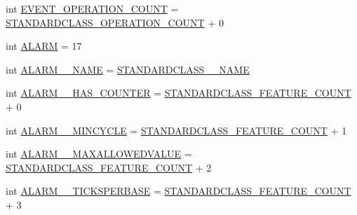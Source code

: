 \begin{DoxyCompactItemize}
\item 
int \hyperlink{interfaceshootingmachineemfmodel_1_1_shootingmachineemfmodel_package_a24a1efdc251910cf4131efe9e2fee313}{E\-V\-E\-N\-T\-\_\-\-O\-P\-E\-R\-A\-T\-I\-O\-N\-\_\-\-C\-O\-U\-N\-T} = \hyperlink{interfaceshootingmachineemfmodel_1_1_shootingmachineemfmodel_package_a2fe5d848cfe0a02fe5609e2c5ed7e7c7}{S\-T\-A\-N\-D\-A\-R\-D\-C\-L\-A\-S\-S\-\_\-\-O\-P\-E\-R\-A\-T\-I\-O\-N\-\_\-\-C\-O\-U\-N\-T} + 0
\item 
int \hyperlink{interfaceshootingmachineemfmodel_1_1_shootingmachineemfmodel_package_adae05455839bcd40f9790082ac94aabc}{A\-L\-A\-R\-M} = 17
\item 
int \hyperlink{interfaceshootingmachineemfmodel_1_1_shootingmachineemfmodel_package_a14df867c3b2b595f2fa93d35083e8097}{A\-L\-A\-R\-M\-\_\-\-\_\-\-N\-A\-M\-E} = \hyperlink{interfaceshootingmachineemfmodel_1_1_shootingmachineemfmodel_package_a06475d7d54d52ee19b2aaf4d5d73c738}{S\-T\-A\-N\-D\-A\-R\-D\-C\-L\-A\-S\-S\-\_\-\-\_\-\-N\-A\-M\-E}
\item 
int \hyperlink{interfaceshootingmachineemfmodel_1_1_shootingmachineemfmodel_package_a28fa4d78a294e9fc65ae0bf38d962461}{A\-L\-A\-R\-M\-\_\-\-\_\-\-H\-A\-S\-\_\-\-C\-O\-U\-N\-T\-E\-R} = \hyperlink{interfaceshootingmachineemfmodel_1_1_shootingmachineemfmodel_package_a14037f66989b3107e402142df96ee9aa}{S\-T\-A\-N\-D\-A\-R\-D\-C\-L\-A\-S\-S\-\_\-\-F\-E\-A\-T\-U\-R\-E\-\_\-\-C\-O\-U\-N\-T} + 0
\item 
int \hyperlink{interfaceshootingmachineemfmodel_1_1_shootingmachineemfmodel_package_a3c7a7e962d5ba6ac8ce25359ed7838ef}{A\-L\-A\-R\-M\-\_\-\-\_\-\-M\-I\-N\-C\-Y\-C\-L\-E} = \hyperlink{interfaceshootingmachineemfmodel_1_1_shootingmachineemfmodel_package_a14037f66989b3107e402142df96ee9aa}{S\-T\-A\-N\-D\-A\-R\-D\-C\-L\-A\-S\-S\-\_\-\-F\-E\-A\-T\-U\-R\-E\-\_\-\-C\-O\-U\-N\-T} + 1
\item 
int \hyperlink{interfaceshootingmachineemfmodel_1_1_shootingmachineemfmodel_package_ad64f07394942e2a562b274dda08a2992}{A\-L\-A\-R\-M\-\_\-\-\_\-\-M\-A\-X\-A\-L\-L\-O\-W\-E\-D\-V\-A\-L\-U\-E} = \hyperlink{interfaceshootingmachineemfmodel_1_1_shootingmachineemfmodel_package_a14037f66989b3107e402142df96ee9aa}{S\-T\-A\-N\-D\-A\-R\-D\-C\-L\-A\-S\-S\-\_\-\-F\-E\-A\-T\-U\-R\-E\-\_\-\-C\-O\-U\-N\-T} + 2
\item 
int \hyperlink{interfaceshootingmachineemfmodel_1_1_shootingmachineemfmodel_package_a92b942ea41959a2f51c36cfed7dae63a}{A\-L\-A\-R\-M\-\_\-\-\_\-\-T\-I\-C\-K\-S\-P\-E\-R\-B\-A\-S\-E} = \hyperlink{interfaceshootingmachineemfmodel_1_1_shootingmachineemfmodel_package_a14037f66989b3107e402142df96ee9aa}{S\-T\-A\-N\-D\-A\-R\-D\-C\-L\-A\-S\-S\-\_\-\-F\-E\-A\-T\-U\-R\-E\-\_\-\-C\-O\-U\-N\-T} + 3

\end{DoxyCompactItemize}
